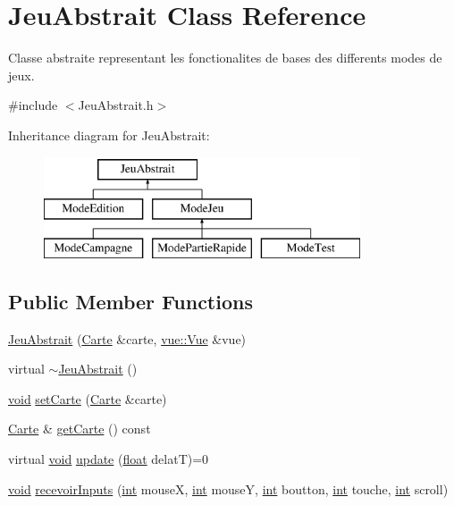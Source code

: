 \hypertarget{class_jeu_abstrait}{\section{Jeu\-Abstrait Class Reference}
\label{class_jeu_abstrait}
}


Classe abstraite representant les fonctionalites de bases des differents modes de jeux.  




{\ttfamily \#include $<$Jeu\-Abstrait.\-h$>$}

Inheritance diagram for Jeu\-Abstrait\-:\begin{figure}[H]
\begin{center}
\leavevmode
\includegraphics[height=3.000000cm]{class_jeu_abstrait}
\end{center}
\end{figure}
\subsection*{Public Member Functions}
\begin{DoxyCompactItemize}
\item 
\hyperlink{group__inf2990_ga72fbc307321309b7e1ee5c0be44a152b}{Jeu\-Abstrait} (\hyperlink{class_carte}{Carte} \&carte, \hyperlink{classvue_1_1_vue}{vue\-::\-Vue} \&vue)
\item 
virtual \hyperlink{group__inf2990_gaeaa1ca9db48bba9637245331fa257076}{$\sim$\-Jeu\-Abstrait} ()
\item 
\hyperlink{wglew_8h_aeea6e3dfae3acf232096f57d2d57f084}{void} \hyperlink{group__inf2990_ga670cec0b00bf489f54a95f3362cd8584}{set\-Carte} (\hyperlink{class_carte}{Carte} \&carte)
\item 
\hyperlink{class_carte}{Carte} \& \hyperlink{group__inf2990_ga473ce72116fb23851e8da0bddfbc71d6}{get\-Carte} () const 
\item 
virtual \hyperlink{wglew_8h_aeea6e3dfae3acf232096f57d2d57f084}{void} \hyperlink{group__inf2990_ga0902140acabbdbca07b110b1c78b6eb6}{update} (\hyperlink{fmod_8h_aeb841aa4b4b5f444b5d739d865b420af}{float} delat\-T)=0
\item 
\hyperlink{wglew_8h_aeea6e3dfae3acf232096f57d2d57f084}{void} \hyperlink{group__inf2990_gac60bf135740871b1770283e508d263df}{recevoir\-Inputs} (\hyperlink{wglew_8h_a500a82aecba06f4550f6849b8099ca21}{int} mouse\-X, \hyperlink{wglew_8h_a500a82aecba06f4550f6849b8099ca21}{int} mouse\-Y, \hyperlink{wglew_8h_a500a82aecba06f4550f6849b8099ca21}{int} boutton, \hyperlink{wglew_8h_a500a82aecba06f4550f6849b8099ca21}{int} touche, \hyperlink{wglew_8h_a500a82aecba06f4550f6849b8099ca21}{int} scroll)
\end{DoxyCompactItemize}
